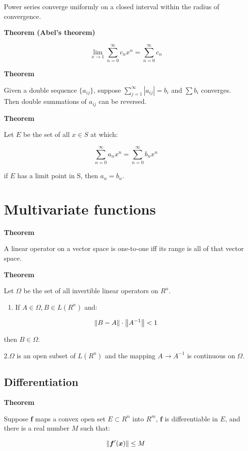 \documentclass[11pt]{article}
\begin{document}
Power series converge uniformly on a closed interval within the radius of convergence.

\textbf{Theorem (Abel's theorem)}

\[
\lim_{x\to 1} \sum_{n=0}^\infty c_n x^n = \sum_{n=0}^\infty c_n
\]

\textbf{Theorem}

Given a double sequence \(\{a_{ij}\}\), suppose \(\sum_{j=1}^\infty |a_{ij}| = b_i\) and \(\sum b_i\) converges. Then double summations of \(a_{ij}\) can be reversed.

\textbf{Theorem}

Let \(E\) be the set of all \(x \in S\) at which:

\[
\sum^\infty_{n=0} a_n x^n = \sum_{n=0}^\infty b_n x^n
\]

if \(E\) has a limit point in S, then \(a_n = b_n\).

\section{Multivariate functions}
\label{sec:orge5c9203}

\textbf{Theorem}

A linear operator on a vector space is one-to-one iff its range is all of that vector space.

\textbf{Theorem}

Let \(\Omega\) be the set of all invertible linear operators on \(R^n\).

\begin{enumerate}
\item If \(A \in \Omega, B \in L(R^n)\) and:
\end{enumerate}

\[
\norm{B - A}\cdot \norm{A^{-1}} < 1
\]

then \(B \in \Omega\).

2.\(\Omega\) is an open subset of \(L(R^n)\) and the mapping \(A \to A^{-1}\) is continuous on \(\Omega\).

\subsection{Differentiation}
\label{sec:org2f38c3f}

\textbf{Theorem}

Suppose \(\bm{f}\) maps a convex open set \(E \subset R^n\) into \(R^m\), \(\bm{f}\) is differentiable in \(E\), and there is a real number \(M\) such that:

\[
\norm{\bm{f}'(\bm{x})} \leq M
\]
\end{document}
